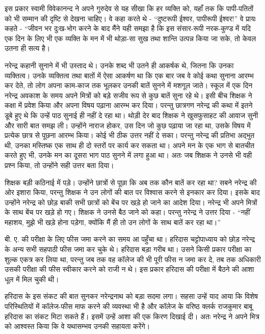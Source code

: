 इस प्रकार स्वामी विवेकानन्द ने अपने गुरुदेव से यह सीखा कि हर व्यक्ति को, यहाँ तक कि पापी-पतितों को भी सम्मान की दृष्टि से देखना चाहिए। वे कहा करते थे - “दुष्टरूपी ईश्वर, पापीरूपी ईश्वर!” वे प्रायः कहते - “जीवन भर दुःख-भोग करने के बाद मैंने यही समझा है कि इस संसार-रूपी नरक-कुण्ड में यदि एक दिन के लिए भी एक व्यक्ति के मन में भी थोड़ा-सा सुख तथा शान्ति उत्पन्न किया जा सके, तो केवल उतना ही सत्य है। 

\delimiter

नरेन्द्र कहानी सुनाने में भी उस्ताद थे। उनके शब्द भी उतने ही आकर्षक थे, जितना कि उनका व्यक्तित्व। उनके व्यक्तित्व तथा बातों में ऐसा आकर्षण था कि एक बार जब वे कोई कथा सुनाना आरम्भ कर देते, तो लोग अपना काम-काज तक भूलकर उनकी बातें सुनने में मशगूल जाते। स्कूल में एक दिन नरेन्द्र अवकाश के समय अपने मित्रों को बड़े सजीव रूप से कुछ बातें सुना रहे थे। इसी बीच शिक्षक ने कक्षा में प्रवेश किया और अपना विषय पढ़ाना आरम्भ कर दिया। परन्तु छात्रगण नरेन्द्र की कथा में इतने डूबे हुए थे कि उन्हें पाठ सुनाई ही नहीं दे रहा था। थोड़ी देर बाद शिक्षक ने खुसफुसाहट की आवाज सुनी और सारी बात समझ ली। उन्होंने नाराज होकर, उस दिन जो कुछ पढ़ाया जा रहा था, उसके विषय में प्रत्येक छात्र से पूछना आरम्भ किया। कोई भी ठीक उत्तर नहीं दे सका। परन्तु नरेन्द्र की प्रतिभा अद्भुत थी, उनका मस्तिष्क एक साथ ही दो स्तरों पर कार्य कर सकता था। अपने मन के एक भाग से बातचीत करते हुए भी, उनके मन का दूसरा भाग पाठ सुनने में लगा हुआ था। अतः जब शिक्षक ने उनसे भी वही प्रश्न किया, तो उन्होंने सही उत्तर बता दिया। 

शिक्षक बड़ी कठिनाई में पड़े। उन्होंने छात्रों से पूछा कि अब तक कौन बातें कर रहा था? सबने नरेन्द्र की ओर इशारा किया, परन्तु शिक्षक ने उन लोगों की बात पर विश्वास करने से इनकार कर दिया। इसके बाद उन्होंने नरेन्द्र को छोड़ बाकी सभी छात्रों को बेंच पर खड़े हो जाने का आदेश दिया। नरेन्द्र भी अपने मित्रों के साथ बेंच पर खड़े हो गए। शिक्षक ने उनसे बैठ जाने को कहा। परन्तु नरेन्द्र ने उत्तर दिया - “नहीं महाशय, मुझे भी खड़े होना पड़ेगा, क्योंकि मैं ही तो उन लोगों के साथ बातें कर रहा था।” 

\delimiter

बी. ए. की परीक्षा के लिए फीस जमा करने का समय आ पहुँचा था। हरिदास चट्टोपाध्याय को छोड़ नरेन्द्र के अन्य सभी सहपाठी फीस जमा कर चुके थे। हरिदास बड़ा गरीब था। उसने किसी प्रकार परीक्षा का शुल्क एकत्र कर लिया था, परन्तु जब तक वह कॉलेज की भी पूरी फीस न जमा कर दे, तब तक अधिकारी उसकी परीक्षा की फीस स्वीकार करने को राजी न थे। इस प्रकार हरिदास की परीक्षा में बैठने की आशा धूल में मिल चुकी थी। 

हरिदास के इस संकट की बात सुनकर नरेन्द्रनाथ को बड़ा सदमा लगा। सहसा उन्हें याद आया कि विशेष परिस्थितियों में कॉलेज-फीस माफ करने की व्यवस्था भी है और कॉलेज के वरिष्ठ क्लर्क राजकुमार बाबू हरिदास का संकट मिटा सकते हैं। इसमें उन्हें आशा की एक किरण दिखाई दी। अतः नरेन्द्र ने अपने मित्र को आश्वस्त किया कि वे यथासम्भव उनकी सहायता करेंगे। 

